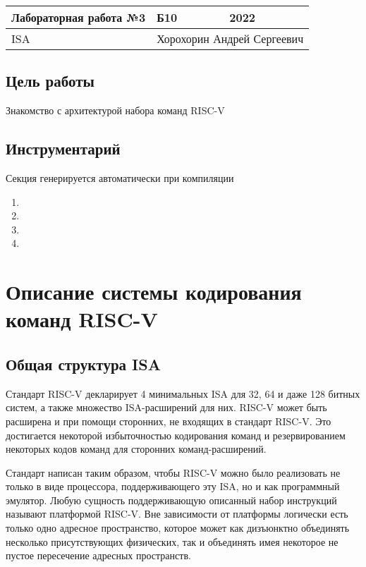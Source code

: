 \documentclass[14pt, russian, onesize]{extreport}
\begin{document}
\begin{tabular}{|p{8cm}|p{3cm}|p{3cm}|}
    \hline
    Лабораторная работа №3 & Б10 & 2022\\
    \hline
    ISA  & \multicolumn{2}{|c|}{Хорохорин Андрей Сергеевич}\\
    \hline
\end{tabular}
\subsection*{ Цель работы }
Знакомство с архитектурой набора команд RISC-V 
\subsection*{ Инструментарий }
Секция генерируется автоматически при компиляции
\begin{enumerate}
    \item {}
    \item {}
    \item {}
    \item {}
\end{enumerate}

\section*{Описание системы кодирования команд RISC-V}
\subsection*{Общая структура ISA}
Стандарт RISC-V декларирует 4 минимальных ISA для 32, 64 и даже 128 битных систем,
а также множество ISA-расширений для них.
RISC-V может быть расширена и при помощи сторонних, не входящих в стандарт RISC-V.
Это достигается некоторой избыточностью кодирования команд и резервированием 
некоторых кодов команд для сторонних команд-расширений.

Стандарт написан таким образом, чтобы RISC-V можно было реализовать 
не только в виде процессора, поддерживающего эту ISA, но и как программный 
эмулятор. Любую сущность поддерживающую описанный набор инструкций называют
платформой RISC-V. Вне зависимости от платформы логически есть только
одно адресное пространство, которое может как дизъюнктно объединять несколько 
присутствующих физических, так и объединять имея некоторое не пустое пересечение
адресных пространств.
\end{document}
